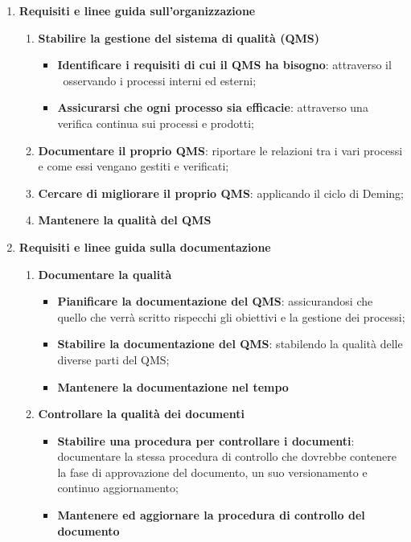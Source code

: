 	\begin{enumerate}
		\item \textbf{Requisiti e linee guida sull'organizzazione}
		\begin{enumerate}
			\item \textbf{Stabilire la gestione del sistema di qualità (QMS)}
			\begin{itemize}
				\item \textbf{Identificare i requisiti di cui il QMS ha bisogno}: attraverso il \PdQ~osservando i processi interni ed esterni;
				\item \textbf{Assicurarsi che ogni processo sia efficacie}: attraverso una verifica continua sui processi e prodotti;
			\end{itemize}
			\item \textbf{Documentare il proprio QMS}: riportare le relazioni tra i vari processi e come essi vengano gestiti e verificati;
			\item \textbf{Cercare di migliorare il proprio QMS}: applicando il ciclo di Deming;
			\item \textbf{Mantenere la qualità del QMS}
		\end{enumerate} 
		
		\item \textbf{Requisiti e linee guida sulla documentazione}
		\begin{enumerate}
			\item \textbf{Documentare la qualità}
			\begin{itemize}
				\item \textbf{Pianificare la documentazione del QMS}: assicurandosi che quello che verrà scritto rispecchi gli obiettivi e la gestione dei processi;
				\item \textbf{Stabilire la documentazione del QMS}: stabilendo la qualità delle diverse parti del QMS;
				\item \textbf{Mantenere la documentazione nel tempo}
			\end{itemize}
			
			\item \textbf{Controllare la qualità dei documenti}
			\begin{itemize}
				\item \textbf{Stabilire una procedura per controllare i documenti}: documentare la stessa procedura di controllo che dovrebbe contenere la fase di approvazione del documento, un suo versionamento e continuo aggiornamento;
				\item \textbf{Mantenere ed aggiornare la procedura di controllo del documento}
			\end{itemize}
		\end{enumerate}
	\end{enumerate}
	
	